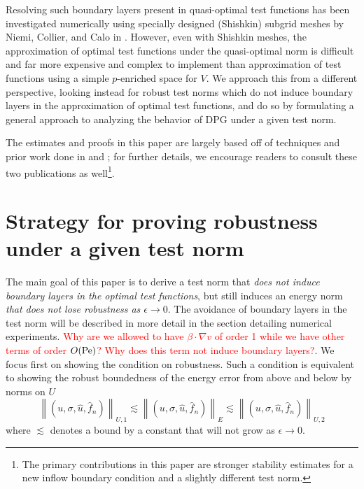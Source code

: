 \documentclass[11pt,onecolumn]{scrartcl}
\newcommand{\grad}{\nabla}
\begin{document}
Resolving such boundary layers present in quasi-optimal test functions has been investigated numerically using specially designed (Shishkin) subgrid meshes by Niemi, Collier, and Calo in \cite{DBLP:journals/procedia/NiemiCC11}.  However, even with Shishkin meshes, the approximation of optimal test functions under the quasi-optimal norm is difficult and far more expensive and complex to implement than approximation of test functions using a simple $p$-enriched space for $V$. We approach this from a different perspective, looking instead for robust test norms which do not induce boundary layers in the approximation of optimal test functions, and do so by formulating a general approach to analyzing the behavior of DPG under a given test norm.  

The estimates and proofs in this paper are largely based off of techniques and prior work done in \cite{DPGrobustness} and \cite{analysisDPG}; for further details, we encourage readers to consult these two publications as well\footnote{The primary contributions in this paper are stronger stability estimates for a new inflow boundary condition and a slightly different test norm.}.  

\section{Strategy for proving robustness under a given test norm}

The main goal of this paper is to derive a test norm that \textit{does not induce boundary layers in the optimal test functions}, but still induces an energy norm \textit{that does not lose robustness as $\epsilon \rightarrow 0$}.  
The avoidance of boundary layers in the test norm will be described in more detail in the section detailing numerical experiments.  
\textcolor{red}{Why are we allowed to have $\beta\cdot \grad v$ of order 1 while we have other terms of order $O({\rm Pe})$?  Why does this term not induce boundary layers?}. We focus first on showing the condition on robustness. Such a condition is equivalent to showing the robust boundedness of the energy error from above and below by norms on $U$ 
\[
\left\| \left(u,\sigma,\widehat{u},\widehat{f}_n\right)\right \|_{U,1} \lesssim  \left\| \left(u,\sigma,\widehat{u},\widehat{f}_n\right)\right \|_E \lesssim \left\| \left(u,\sigma,\widehat{u},\widehat{f}_n\right)\right \|_{U,2}
\]
where $\lesssim$ denotes a bound by a constant that will not grow as $\epsilon \rightarrow 0$.  
\end{document}
